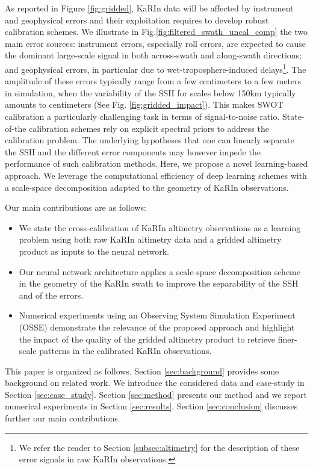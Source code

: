 \begin{bibunit}
As reported in Figure \ref{fig:gridded}, KaRIn data will be affected by instrument and geophysical errors  \cite{ubelmann_swot_nodate} and their exploitation requires to develop robust calibration schemes. We illustrate in Fig.\ref{fig:filtered_swath_uncal_comp} the two main error sources: instrument errors, especially roll errors, are expected to cause the dominant large-scale signal in both across-swath and along-swath directions; and geophysical errors, in particular due to wet-troposphere-induced delays\footnote{We refer the reader to Section \ref{subsec:altimetry} for the description of these error signals in raw KaRIn observations.}.  
The amplitude of these errors typically range from a few centimeters to a few meters in simulation, when the variability of the SSH for scales below 150km typically amounts to centimeters (See Fig. \ref{fig:gridded_impact}). This makes SWOT calibration a particularly challenging task in terms of signal-to-noise ratio. State-of-the calibration schemes \cite{Dibarboure_Ubelmann_Flamant_Briol_Peral_Bracher_Vergara_Faugere_Soulat_Picot_2022} rely on explicit spectral priors to address the calibration problem. 
The underlying hypotheses that one can linearly separate the SSH and the different error components may however impede the performance of such calibration methods. Here, we propose a novel learning-based approach. 
We leverage the computational efficiency of deep learning schemes with a scale-space decomposition \cite{Witkin_1984} adapted to the geometry of KaRIn observations. 

Our main contributions are as follows:
\begin{itemize}
\item{We state the cross-calibration of KaRIn altimetry observations as a learning problem using both raw KaRIn altimetry data and a gridded altimetry product as inputs to the neural network.}
\item{Our neural network architecture applies a scale-space decomposition scheme in the geometry of the KaRIn swath to improve the separability of the SSH and of the errors.}
\item{Numerical experiments using an Observing System Simulation Experiment (OSSE) demonstrate the relevance of the proposed approach and highlight the impact of the quality of the gridded altimetry product to retrieve finer-scale patterns in the calibrated KaRIn observations.}
\end{itemize}
This paper is organized as follows. Section \ref{sec:background} provides some background on related work. We introduce the considered data and case-study in Section \ref{sec:case_study}. 
Section \ref{sec:method} presents our method and we report numerical experiments in Section \ref{sec:results}. 
Section \ref{sec:conclusion} discusses further our main contributions.


\end{bibunit}
